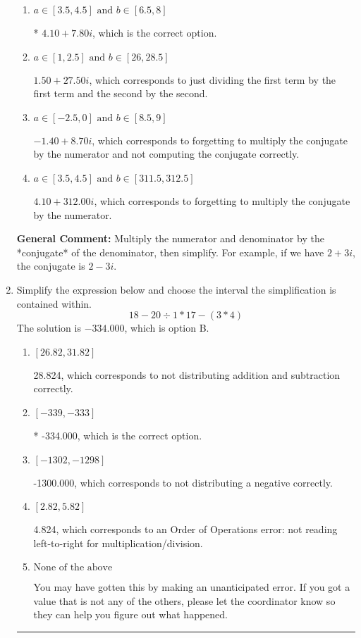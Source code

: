 \documentclass{extbook}[14pt]
\newcommand{\litem}[1]{\item #1

\rule{\textwidth}{0.4pt}}
\begin{document}
\begin{enumerate}
{\begin{enumerate}[label=\Alph*.]
 $164.00  + 7.80 i$, which corresponds to forgetting to multiply the conjugate by the numerator and using a plus instead of a minus in the denominator.
\item \( a \in [3.5, 4.5] \text{ and } b \in [6.5, 8] \)

* $4.10  + 7.80 i$, which is the correct option.
\item \( a \in [1, 2.5] \text{ and } b \in [26, 28.5] \)

 $1.50  + 27.50 i$, which corresponds to just dividing the first term by the first term and the second by the second.
\item \( a \in [-2.5, 0] \text{ and } b \in [8.5, 9] \)

 $-1.40  + 8.70 i$, which corresponds to forgetting to multiply the conjugate by the numerator and not computing the conjugate correctly.
\item \( a \in [3.5, 4.5] \text{ and } b \in [311.5, 312.5] \)

 $4.10  + 312.00 i$, which corresponds to forgetting to multiply the conjugate by the numerator.
\end{enumerate}

\textbf{General Comment:} Multiply the numerator and denominator by the *conjugate* of the denominator, then simplify. For example, if we have $2+3i$, the conjugate is $2-3i$.
}
\litem{
Simplify the expression below and choose the interval the simplification is contained within.
\[ 18 - 20 \div 1 * 17 - (3 * 4) \]The solution is \( -334.000 \), which is option B.\begin{enumerate}[label=\Alph*.]
\item \( [26.82, 31.82] \)

 28.824, which corresponds to not distributing addition and subtraction correctly.
\item \( [-339, -333] \)

* -334.000, which is the correct option.
\item \( [-1302, -1298] \)

 -1300.000, which corresponds to not distributing a negative correctly.
\item \( [2.82, 5.82] \)

 4.824, which corresponds to an Order of Operations error: not reading left-to-right for multiplication/division.
\item \( \text{None of the above} \)

 You may have gotten this by making an unanticipated error. If you got a value that is not any of the others, please let the coordinator know so they can help you figure out what happened.
\end{enumerate}

}
\end{enumerate}
\end{document}
